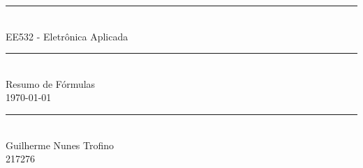 \documentclass{article}
\begin{document}
    \begin{titlepage}
        \begin{center}
            \rule{450pt}{0.5pt}\\[4mm]
            {\Huge EE532 - Eletrônica Aplicada}\\
            \rule{450pt}{0.5pt}\\[2mm]
            {\Large Resumo de Fórmulas}\\[200mm]
            \today\\
            \rule{250pt}{0.5pt}\\
            {\large Guilherme Nunes Trofino}\\
            {\large 217276}\\
        \end{center}
    \end{titlepage}
\newpage

    \tableofcontents
\newpage
\end{document}
